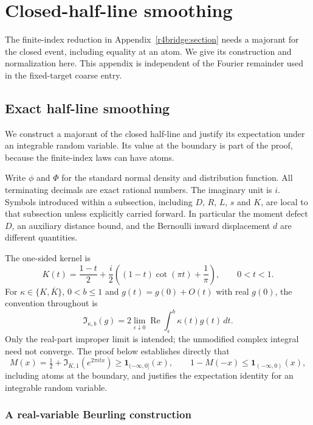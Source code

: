 \section{Closed-half-line smoothing}\label{v9:prawitz:appendix}
The finite-index reduction in Appendix~\ref{r4bridge:section} needs a
majorant for the closed event, including equality at an atom. We give its
construction and normalization here. This appendix is independent of the
Fourier remainder used in the fixed-target coarse entry.

\subsection{Exact half-line smoothing}
\label{ms:fourier:kernel}

We construct a majorant of the closed half-line and justify its
expectation under an integrable random variable. Its value at the boundary
is part of the proof, because the finite-index laws can have atoms.

Write $\phi$ and $\Phi$ for the standard normal density and distribution
function. All terminating decimals are exact rational numbers. The
imaginary unit is $i$. Symbols introduced within a subsection, including
$D$, $R$, $L$, $s$ and $K$, are local to that subsection unless explicitly
carried forward. In particular the moment defect $D$, an auxiliary distance
bound, and the Bernoulli inward displacement $d$ are different quantities.

The one-sided kernel is
\[
 K(t)=\frac{1-t}{2}+\frac{i}{2}
       \left((1-t)\cot(\pi t)+\frac1\pi\right),\qquad 0<t<1.
\]
For $\kappa\in\{K,\overline K\}$, $0<b\le1$ and
$g(t)=g(0)+O(t)$ with real $g(0)$, the convention throughout is
\begin{equation}\label{ms:fourier:kernel-convention}
 \mathfrak I_{\kappa,b}(g)
 =2\lim_{\epsilon\downarrow0}\operatorname{Re}
       \int_\epsilon^b\kappa(t)g(t)\,dt.
\end{equation}
Only the real-part improper limit is intended; the unmodified complex
integral need not converge. The proof below establishes directly that
\[
 M(x)=\tfrac12+\mathfrak I_{K,1}(e^{2\pi itx})
       \ge\mathbf1_{(-\infty,0]}(x),\qquad
 1-M(-x)\le\mathbf1_{(-\infty,0)}(x),
\]
including atoms at the boundary, and justifies the expectation identity
for an integrable random variable.

\subsubsection{A real-variable Beurling construction}

